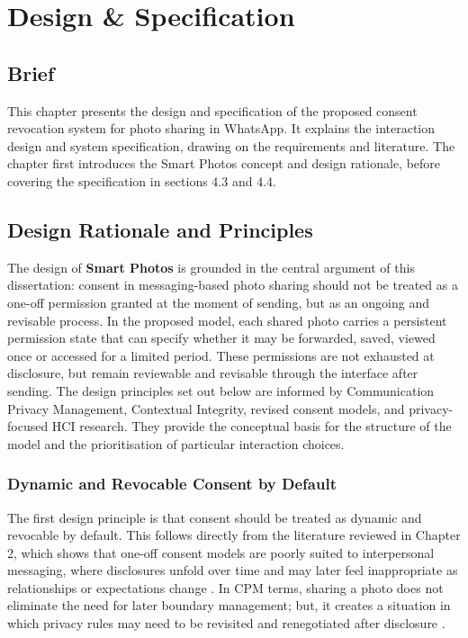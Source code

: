 \chapter{Design \& Specification}

\section{Brief}
This chapter presents the design and specification of the proposed consent revocation system for photo sharing in WhatsApp. It explains the interaction design and system specification, drawing on the requirements and literature. The chapter first introduces the Smart Photos concept and design rationale, before covering the specification in sections 4.3 and 4.4. 

\section{Design Rationale and Principles}
The design of \textbf{Smart Photos} is grounded in the central argument of this dissertation: consent in messaging-based photo sharing should not be treated as a one-off permission granted at the moment of sending, but as an ongoing and revisable process. In the proposed model, each shared photo carries a persistent permission state that can specify whether it may be forwarded, saved, viewed once or accessed for a limited period. These permissions are not exhausted at disclosure, but remain reviewable and revisable through the interface after sending. The design principles set out below are informed by Communication Privacy Management, Contextual Integrity, revised consent models, and privacy-focused HCI research. They provide the conceptual basis for the structure of the model and the prioritisation of particular interaction choices.

\subsection{Dynamic and Revocable Consent by Default}
The first design principle is that consent should be treated as dynamic and revocable by default. This follows directly from the literature reviewed in Chapter 2, which shows that one-off consent models are poorly suited to interpersonal messaging, where disclosures unfold over time and may later feel inappropriate as relationships or expectations change \cite{kaye_dynamic_2015,im_yes_2021}. In CPM terms, sharing a photo does not eliminate the need for later boundary management; but, it creates a situation in which privacy rules may need to be revisited and renegotiated after disclosure \cite{petronio_cpm_2020,child_petronio_cmc_privacy_2011}. 

